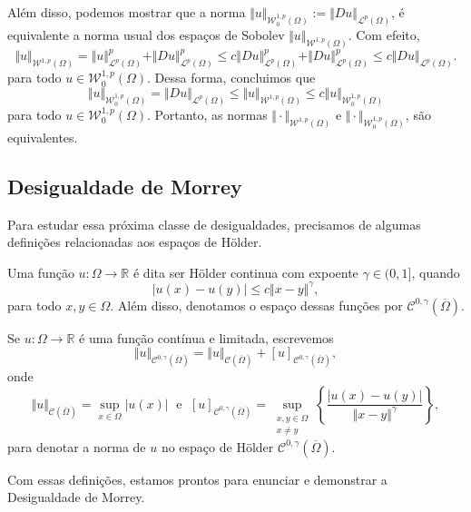 \documentclass[a4paper, 11pt]{book}
\theoremstyle{definition}
\newcommand{\bR}{\mathbb{R}}
\newcommand{\cC}{\mathcal{C}}
\newcommand{\cL}{\mathcal{L}}
\newcommand{\cW}{\mathcal{W}}
\begin{document}
Além disso, podemos mostrar que a norma $\Vert u \Vert_{\cW_0^{1,p}(\Omega)} := \Vert Du \Vert_{\cL^p(\Omega)}$, é equivalente a norma usual dos espaços de Sobolev $\Vert u \Vert_{\cW^{1,p}(\Omega)}$. Com efeito,
\[
    \Vert u \Vert_{\cW^{1,p}(\Omega)} = \Vert u \Vert_{\cL^p(\Omega)}^p + \Vert Du \Vert_{\cL^p(\Omega)}^p \leqslant c \Vert Du \Vert_{\cL^p(\Omega)}^p + \Vert Du \Vert_{\cL^p(\Omega)}^p \leqslant c \Vert Du \Vert_{\cL^p(\Omega)}.
\]
para todo $u \in \cW^{1,p}_0(\Omega)$.
Dessa forma, concluimos que
\[
    \Vert u \Vert_{\cW^{1,p}_0(\Omega)} = \Vert Du \Vert_{\cL^p(\Omega)} \leqslant \Vert u \Vert_{\cW^{1,p}(\Omega)} \leqslant c \Vert u \Vert_{\cW^{1,p}_0(\Omega)}
\]
para todo $u \in \cW^{1,p}_0(\Omega)$.
Portanto, as normas $\Vert \cdot \Vert_{\cW^{1,p}(\Omega)}$ e $\Vert \cdot \Vert_{\cW^{1,p}_0(\Omega)}$, são equivalentes.

\subsection{Desigualdade de Morrey}

Para estudar essa próxima classe de desigualdades, precisamos de algumas definições relacionadas aos espaços de Hölder.

\begin{dbox}
    Uma função $u : \Omega \to \bR$ é dita ser Hölder continua com expoente $\gamma \in (0,1]$, quando
    \[
        |u(x) - u(y)| \leqslant c \Vert x - y \Vert^\gamma,
    \]
    para todo $x,y \in \Omega$. Além disso, denotamos o espaço dessas funções por $\cC^{0,\gamma}(\overline\Omega)$.
\end{dbox}

\begin{dbox}
    Se $u : \Omega \to \bR$ é uma função contínua e limitada, escrevemos
    \[
        \Vert u \Vert_{\cC^{0,\gamma}(\overline\Omega)} = \Vert u \Vert_{\cC(\overline\Omega)} + [u]_{\cC^{0,\gamma}(\overline\Omega)},
    \]
    onde
    \[
        \Vert u \Vert_{\cC(\overline\Omega)} = \sup_{x \in \Omega} |u(x)| \;\text{ e }\; [u]_{\cC^{0,\gamma}(\overline\Omega)} = \sup_{\substack{x,y \in \Omega\\x \neq y}} \left\{ \frac{|u(x) - u(y)|}{\Vert x - y \Vert^\gamma} \right\},
    \]
    para denotar a norma de $u$ no espaço de Hölder $\cC^{0,\gamma}(\overline\Omega)$.
\end{dbox}

Com essas definições, estamos prontos para enunciar e demonstrar a Desigualdade de Morrey.
\end{document}
